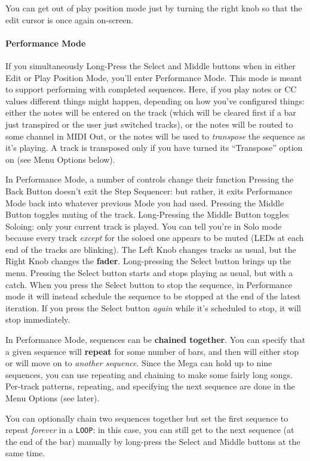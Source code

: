 \documentclass{article}
\begin{document}
You can get out of play position mode just by turning the right knob so that the edit cursor is once again on-screen.

\paragraph{Performance Mode} If you simultaneously Long-Press the Select and Middle buttons when in either Edit or Play Position Mode, you'll enter Performance Mode.  This mode is meant to support performing with completed sequences.  Here, if you play notes or CC values different things might happen, depending on how you've configured things: either the notes will be entered on the track (which will be cleared first if a bar just transpired or the user just switched tracks), or the notes will be routed to some channel in MIDI Out, or the notes will be used to {\it transpose} the sequence as it's playing.  A track is transposed only if you have turned its ``Transpose'' option on (see Menu Options below).

In Performance Mode, a number of controls change their function  Pressing the Back Button doesn't exit the Step Sequencer: but rather, it exits Performance Mode back into whatever previous Mode you had used.  Pressing the Middle Button toggles muting of  the track.  Long-Pressing the Middle Button toggles Soloing: only your current track is played.  You can tell you're in Solo mode because every track {\it except} for the soloed one appears to be muted (LEDs at each end of the tracks are blinking).  The Left Knob changes tracks as usual, but the Right Knob changes the {\bf fader}.  Long-pressing the Select button brings up the menu.  Pressing the Select button starts and stops playing as usual, but with a catch.  When you press the Select button to stop the sequence, in Performance mode it will instead schedule the sequence to be stopped at the end of the latest iteration.  If you press the Select button {\it again} while it's scheduled to stop, it will stop immediately.

In Performance Mode, sequences can be {\bf chained together}.  You can specify that a given sequence will {\bf repeat} for some number of bars, and then will either stop or will move on to {\it another sequence}.  Since the Mega can hold up to nine sequences, you can use repeating and chaining to make some fairly long songs.  Per-track patterns, repeating, and specifying the next sequence are done in the Menu Options (see later).

You can optionally chain two sequences together but set the first sequence to repeat {\it forever} in a {\tt LOOP}: in this case, you can still get to the next sequence (at the end of the bar) manually by long-press the Select and Middle buttons at the same time.
\end{document}

